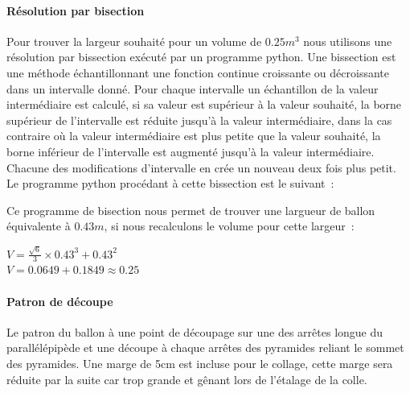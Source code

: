 \documentclass[a4paper,11pt]{article}
\begin{document}
\paragraph{Résolution par bisection}

Pour trouver la largeur souhaité pour un volume de $0.25m^3$ nous utilisons une résolution par bissection exécuté par un programme python. Une bissection est une méthode échantillonnant une fonction continue croissante ou décroissante dans un intervalle donné. Pour chaque intervalle un échantillon de la valeur intermédiaire est calculé, si sa valeur est supérieur à la valeur souhaité, la borne supérieur de l'intervalle est réduite jusqu'à la valeur intermédiaire, dans la cas contraire où la valeur intermédiaire est plus petite que la valeur souhaité, la borne inférieur de l'intervalle est augmenté jusqu'à la valeur intermédiaire. Chacune des modifications d'intervalle en crée un nouveau deux fois plus petit.
\medbreak
Le programme python procédant à cette bissection est le suivant~:



Ce programme de bisection nous permet de trouver une largueur de ballon équivalente à $0.43m$, si nous recalculons le volume pour cette largeur~:

\begin{center}
  $\displaystyle{V = \frac{\sqrt{6}}{3} \times 0.43^3 + 0.43^2 }$ \\
	$\displaystyle{V = 0.0649 + 0.1849 \approx 0.25}$
\end{center}

\paragraph{Patron de découpe}

Le patron du ballon à une point de découpage sur une des arrêtes longue du parallélépipède et une découpe à chaque arrêtes des pyramides reliant le sommet des pyramides. Une marge de 5cm est incluse pour le collage, cette marge sera réduite par la suite car trop grande et gênant lors de l'étalage de la colle.
\end{document}
